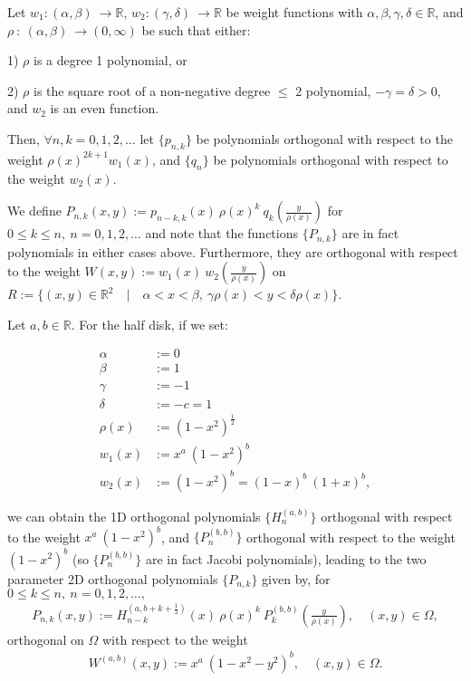 \documentclass[11pt, oneside]{article}   	%
\newcommand{\half}{\frac{1}{2}}
\newcommand{\R}{\mathbb{R}}
\newcommand{\Pnk}{P_{n,k}}
\begin{document}
Let \(w_1 : (\alpha,\beta) \: \to \R\), \(w_2 : (\gamma,\delta) \: \to \R\) be weight functions with \(\alpha,\beta,\gamma,\delta \in \R\), and \(\rho \: : \: (\alpha,\beta) \: \to (0,\infty)\) be such that either:

1) \(\rho\) is a degree 1 polynomial, or 

2) \(\rho\) is the square root of a non-negative degree \(\le\) 2 polynomial, \(-\gamma = \delta > 0\), and \(w_2\) is an even function.

Then, \(\forall n,k = 0,1,2,\dots\) let \(\{p_{n,k}\}\) be polynomials orthogonal with respect to the weight \(\rho(x)^{2k+1} w_1(x)\), and \(\{q_{n}\}\) be polynomials orthogonal with respect to the weight \(w_2(x)\).

We define \(\Pnk(x,y) := p_{n-k,k}(x) \: \rho(x)^k \: q_k(\frac{y}{\rho(x)})\) for \( 0 \le k \le n, \: n = 0,1,2,\dots\) and note that the functions \(\{\Pnk\}\) are in fact polynomials in either cases above. Furthermore, they are orthogonal with respect to the weight \(W(x,y) := w_1(x) \: w_2(\frac{y}{\rho(x)}) \) on \(R := \{(x,y) \in \R^2 \quad | \quad \alpha < x < \beta, \: \gamma \rho(x) < y < \delta \rho(x)\}\).

Let \(a, b \in \R\). For the half disk, if we set:

\begin{align}
\alpha &:= 0 \\
\beta &:= 1 \\
\gamma &:= -1 \\
\delta &:= -c = 1 \\
\rho(x) &:= (1-x^2)^{\half} \\
w_1(x) &:= x^a \: (1-x^2)^b \\
w_2(x) &:= (1-x^2)^b = (1-x)^b \: (1+x)^b,
\end{align}

we can obtain the 1D orthogonal polynomials \(\{H_n^{(a, b)}\}\) orthogonal with respect to the weight \(x^a \: (1-x^2)^b\), and \(\{P_n^{(b, b)}\}\) orthogonal with respect to the weight \((1-x^2)^b\) (so \(\{P_n^{(b, b)}\}\) are in fact Jacobi polynomials), leading to the two parameter 2D orthogonal polynomials \(\{\Pnk\}\) given by, for \(0 \le k \le n, \: n = 0,1,2,\dots,\)
\begin{align}
 \Pnk(x,y) := H_{n-k}^{(a, b+k+\half)}(x) \: \rho(x)^k \: P_k^{(b,b)}(\frac{y}{\rho(x)}), \quad (x,y) \in \Omega, 
\end{align}
orthogonal on \(\Omega\) with respect to the weight 
\begin{align}
W^{(a,b)}(x,y) := x^a \: (1-x^2-y^2)^b, \quad (x,y) \in \Omega.
\end{align}
\end{document}
